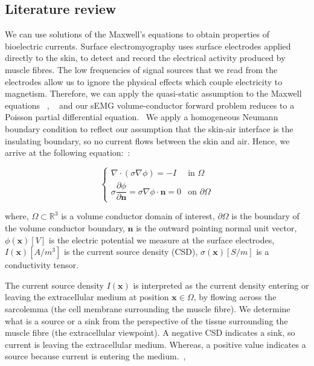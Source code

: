 \documentclass[project-plan]{report-template}
\begin{document}
\subsection{Literature review}
We can use solutions of the Maxwell's equations to obtain properties of bioelectric currents. Surface electromyography uses surface electrodes applied directly to the skin, to detect and record the electrical activity produced by muscle fibres. The low frequencies of signal sources that we read from the electrodes allow us to ignore the physical effects which couple electricity to magnetism. Therefore, we can apply the quasi-static assumption to the Maxwell equations ~\cite{plonsey1977}, ~\cite{plonsey1967} and our sEMG volume-conductor forward problem reduces to a Poisson partial differential equation.~\cite{mesin2013} We apply a homogeneous Neumann boundary condition to reflect our assumption that the skin-air interface is the insulating boundary, so no current flows between the skin and air. Hence, we arrive at the following equation:~\cite{maksymenko2023}:

\begin{equation}
\begin{cases}
\nabla \cdot (\sigma \nabla \phi) = -I & \text{in } \Omega \\
\sigma \dfrac{\partial \phi}{\partial \mathbf{n}}
  = \sigma \nabla \phi \cdot \mathbf{n} = 0 & \text{on } \partial \Omega
\end{cases}
\end{equation}

where, \newline
$\Omega \subset \mathbb{R}^3$ is a volume conductor domain of interest, \newline$\partial \Omega$ is the boundary of the volume conductor boundary, \newline $\mathbf{n}$ is the outward pointing normal unit vector, \newline $\phi(\mathbf{x})[V]$ is the electric potential we measure at the surface electrodes, \newline $I(\mathbf{x})[A/m^3]$ is the current source density (CSD), \newline $\sigma(\mathbf{x})[S/m]$ is a conductivity tensor.

The current source density $I(\mathbf{x})$ is interpreted as the current density entering or leaving the extracellular medium at position $\mathbf{x} \in \Omega$, by flowing across the sarcolemma (the cell membrane surrounding the muscle fibre). We determine what is a source or a sink from the perspective of the tissue surrounding the muscle fibre (the extracellular viewpoint). A negative CSD indicates a sink, so current is leaving the extracellular medium. Whereas, a positive value indicates a source because current is entering the medium.~\cite{nicholson1975},~\cite{pettersen2012}
\end{document}
